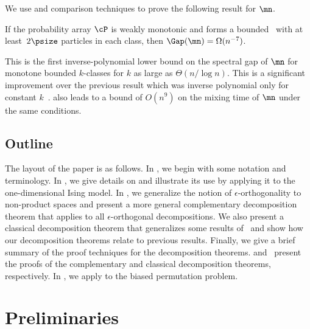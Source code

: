 \documentclass{toc}
\begin{document}
We use  and comparison techniques to prove the following result for $\mn$.

\newtheorem*{mnGap}{}
\begin{theorem}\label{thm:mnGap} If the
%
probability array $\cP$ is  %
weakly monotonic and
%
forms  %
a bounded \kP\, with at least~$2\psize$ particles 
 in each class, then $\Gap(\mn)=\Omega(n^{-7})$.
\end{theorem}
 
\noindent This is the first inverse-polynomial %
lower   %
bound on the spectral 
gap of $\mn$ for monotone bounded $k$-classes for $k$ as large as 
$\Theta(n/\log n)$.  This is a significant improvement over the 
previous result which was inverse polynomial only for constant 
$k$~\cite{MR00}.   also leads to a bound of 
$O(n^9)$ on the mixing time of $\mn$ under the same conditions.

\subsection{Outline}

The layout of the paper is as follows.  In , we 
begin with some notation and terminology.  In 
, we give details on 
 and illustrate its use by applying it 
to the one-dimensional Ising model. In 
, we generalize the notion of 
$\epsilon$-orthogonality to non-product spaces and present a more 
general complementary decomposition theorem that applies to all 
$\epsilon$-orthogonal decompositions. We also present a classical 
decomposition theorem that generalizes some results of~\cite{jstv04} 
and show how our decomposition theorems relate to previous results. 
Finally, we give a brief summary of the proof techniques for the 
decomposition theorems.   
and~ present the proofs of the complementary and 
classical decomposition theorems, respectively. In 
, we apply  to the 
biased permutation problem. 


\section{Preliminaries}\label{sec:prelim}
\end{document}
